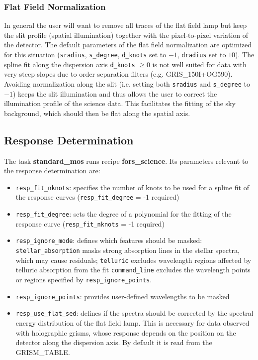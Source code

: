 \subsubsection{Flat Field Normalization}

In general the user will want to remove all traces of the flat field lamp but keep the slit profile (spatial illumination) together with the pixel-to-pixel variation of the detector. The default parameters of the flat field
normalization are optimized for this situation ({\tt sradius}, {\tt s\_degree}, {\tt d\_knots} set to $-1$, {\tt dradius} set to $10$). The spline fit along the dispersion axis {\tt d\_knots} $\geq 0$ is not well suited for data with very steep slopes due to order separation filters (e.g. GRIS\_150I+OG590).
Avoiding normalization along the slit (i.e. setting both {\tt sradius} and {\tt s\_degree} to $-1$) keeps the slit illumination and thus allows the user to correct the illumination profile of the science data. This facilitates the fitting of the sky background, which should then be flat along the spatial axis.





\subsection{Response Determination}

The task {\bf standard\_mos} runs recipe {\bf fors\_science}. 
Its parameters relevant to the response determination are:
\begin{itemize}

\item {\tt resp\_fit\_nknots}: specifies the number of knots to be used for a spline fit of the response curves ({\tt resp\_fit\_degree} = -1 required)

\item {\tt resp\_fit\_degree}: sets the degree of a polynomial for the fitting of the response curve ({\tt resp\_fit\_nknots} = -1 required)

 \item {\tt resp\_ignore\_mode}: defines which features should be masked: {\tt stellar\_absorption} masks strong absorption lines in the stellar spectra, which may cause residuals; {\tt telluric} excludes wavelength regions affected by telluric absorption from the fit {\tt command\_line} excludes the wavelength points or regions specified by {\tt resp\_ignore\_points}.

\item {\tt resp\_ignore\_points}: provides user-defined wavelengths to be masked

\item {\tt resp\_use\_flat\_sed}: defines if the spectra should be corrected by the spectral energy distribution of the flat field lamp. This is necessary for data observed with holographic grisms, whose response depends on the position on the detector along the dispersion axis. By default it is read from the GRISM\_TABLE.

\end{itemize}

